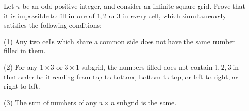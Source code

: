 Let $n$ be an odd positive integer, and consider an infinite square grid. Prove that it is impossible to fill in one of $1,2$ or $3$ in every cell, which simultaneously satisfies the following conditions:

(1) Any two cells which share a common side does not have the same number filled in them.

(2) For any $1\times 3$ or $3\times 1$ subgrid, the numbers filled does not contain $1,2,3$ in that order be it reading from top to bottom, bottom to top, or left to right, or right to left.

(3) The sum of numbers of any $n\times n$ subgrid is the same.